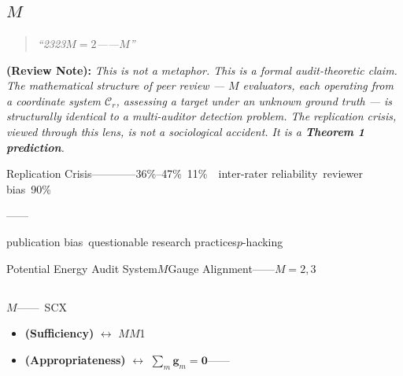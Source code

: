 \documentclass[12pt,a4paper]{article}
\theoremstyle{remark}
\newcommand{\sumgd}{\sum_m \mathbf{g}_m = \mathbf{0}}
\newcommand{\coordSys}{\mathcal{C}}
\newcommand{\reviewnote}[1]{%
    \medskip\noindent
    \textbf{ (Review Note):} \textit{#1}%
}
\begin{document}
\tableofcontents
\newpage

\section{}
\label{sec:intro}

\subsection{$M$}

\begin{quotation}
\noindent\textit{“2323$M=2$——$M$”}
\end{quotation}

\noindent
\reviewnote{This is not a metaphor. This is a formal audit-theoretic claim. The mathematical structure of peer review — $M$ evaluators, each operating from a coordinate system $\coordSys_r$, assessing a target under an unknown ground truth — is structurally identical to a multi-auditor detection problem. The replication crisis, viewed through this lens, is not a sociological accident. It is a \textbf{Theorem 1 prediction}.}

Replication Crisis————36\%--47\%~\cite{open2015reproducibility}11\%~\cite{errington2021investigating}~\cite{camerer2016evaluating,camerer2018evaluating}inter-rater reliability~\cite{bornmann2011scientific}reviewer bias~\cite{lee2013bias}90\%~

\cite{hojati2014journal}——

publication bias~\cite{fanelli2012negative}questionable research practices$p$-hacking~\cite{simonsohn2014p}~\cite{nosek2012scientific}\textbf{}

\textbf{}Potential Energy Audit System$M$\textbf{}Gauge Alignment——$M=2,3$\textbf{}

\subsection{}

$M$\textbf{}——~\cite{arens2016auditing}SCX

\begin{itemize}
    \item \textbf{ (Sufficiency)} $\leftrightarrow$ $M$$M$1~\cite{scx_thm1}
    \item \textbf{ (Appropriateness)} $\leftrightarrow$  $\sumgd$——
\end{itemize}
\end{document}
